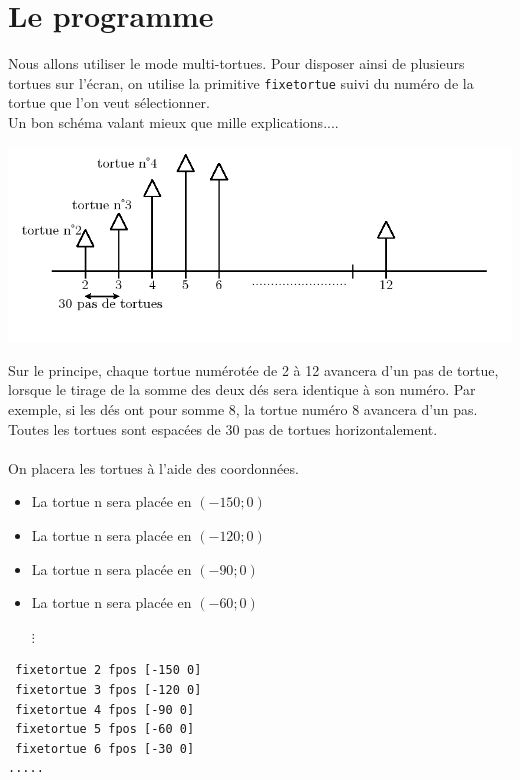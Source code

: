  \section{Le programme}
  Nous allons utiliser le mode multi-tortues. Pour disposer ainsi de plusieurs tortues sur l'écran, on utilise la primitive \texttt{fixetortue} suivi du numéro de la tortue que l'on veut sélectionner.\\
  Un bon schéma valant mieux que mille explications....
\begin{center}
\includegraphics[scale=0.45]{images/somme-des-schema.png}
\end{center}
\vspace{0.5cm}
Sur le principe, chaque tortue numérotée de 2 à 12 avancera d'un pas de tortue, lorsque le tirage de la somme des deux dés sera identique à son numéro. Par exemple, si les dés ont pour somme 8, la tortue numéro 8 avancera d'un pas. Toutes les tortues sont espacées de 30 pas de tortues horizontalement.\\ \\
On placera les tortues à l'aide des coordonnées.
\begin{itemize}
 \item  La tortue n sera placée en $(-150;0)$
 \item  La tortue n sera placée en $(-120;0)$
 \item  La tortue n sera placée en $(-90;0)$
 \item  La tortue n sera placée en $(-60;0)$\\
\begin{minipage}{8 cm}
\begin{center}
 $\vdots$
\end{center}
\end{minipage}
\end{itemize}
\begin{verbatim}
 fixetortue 2 fpos [-150 0]
 fixetortue 3 fpos [-120 0]
 fixetortue 4 fpos [-90 0]
 fixetortue 5 fpos [-60 0]
 fixetortue 6 fpos [-30 0]
.....
\end{verbatim}
